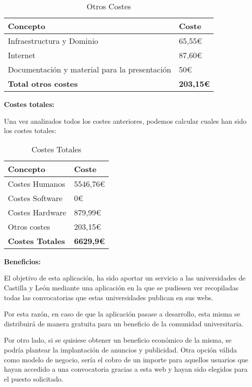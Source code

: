 \begin{table}[H]
    \centering
    \setlength{\tabcolsep}{20pt}
    \begin{tabular}{l l}
        \hline
        \textbf{Concepto} & \textbf{Coste} \\ \hline
        Infraestructura y Dominio & 65,55€ \\
        Internet  & 87,60€\\
        Documentación y material para la presentación & 50€\\  \hline
        \textbf{Total otros costes} & \textbf{203,15€}\\ \hline
    \end{tabular}
    \caption{Otros Costes}
    \label{tab:otros_costes}
\end{table}


\textbf{Costes totales:}

Una vez analizados todos los costes anteriores, podemos calcular cuales han sido los costes totales:

\begin{table}[H]
    \centering
    \renewcommand{\arraystretch}{1.2}
    \setlength{\tabcolsep}{20pt}
    \begin{tabular}{l l}
        \hline
        \textbf{Concepto} & \textbf{Coste} \\ \hline
        Costes Humanos & 5546,76€ \\
        Costes Software & 0€ \\
        Costes Hardware  & 879,99€\\
        Otros costes & 203,15€\\  \hline
        \textbf{Costes Totales} & \textbf{6629,9€}\\ \hline
    \end{tabular}
    \caption{Costes Totales}
    \label{tab:costes_totales}
\end{table}

\textbf{Beneficios:}

El objetivo de esta aplicación, ha sido aportar un servicio a las universidades de Castilla y León mediante una aplicación en la que se pudiesen ver recopiladas todas las convocatorias que estas universidades publican en sus webs. 

Por esta razón, en caso de que la aplicación pasase a desarrollo, esta misma se distribuirá de manera gratuita para un beneficio de la comunidad universitaria.

Por otro lado, si se quisiese obtener un beneficio económico de la misma, se podría plantear la implantación de anuncios y publicidad. Otra opción válida como modelo de negocio, sería el cobro de un importe para aquellos usuarios que hayan accedido a una convocatoria gracias a esta web y hayan sido elegidos para el puesto solicitado.

